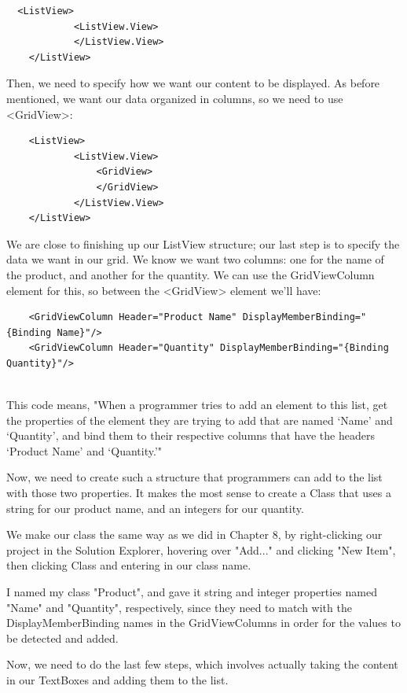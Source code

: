 \documentclass[oneside, openany] {book}
\begin{document}
\begin{verbatim}
  <ListView>
            <ListView.View>
            </ListView.View>
    </ListView>
\end{verbatim}

Then, we need to specify how we want our content to be displayed. As before mentioned, we want our data organized in columns, so we need to use <GridView>:

\begin{verbatim}
    <ListView>
            <ListView.View>
                <GridView>
                </GridView>
            </ListView.View>
    </ListView>
\end{verbatim}
We are close to finishing up our ListView structure; our last step is to specify the data we want in our grid. We know we want two columns: one for the name of the product, and another for the quantity. We can use the GridViewColumn element for this, so between the <GridView> element we'll have:

\begin{verbatim}
    <GridViewColumn Header="Product Name" DisplayMemberBinding="{Binding Name}"/>
    <GridViewColumn Header="Quantity" DisplayMemberBinding="{Binding Quantity}"/>
             
\end{verbatim}
This code means, "When a programmer tries to add an element to this list, get the properties of the element they are trying to add that are named `Name' and `Quantity', and bind them to their respective columns that have the headers `Product Name' and `Quantity.'"

Now, we need to create such a structure that programmers can add to the list with those two properties. It makes the most sense to create a Class that uses a string for our product name, and an integers for our quantity. 

We make our class the same way as we did in Chapter 8, by right-clicking our project in the Solution Explorer, hovering over "Add..." and clicking "New Item", then clicking Class and entering in our class name.

I named my class "Product", and gave it string and integer properties named "Name" and "Quantity", respectively, since they need to match with the DisplayMemberBinding names in the GridViewColumns in order for the values to be detected and added.

Now, we need to do the last few steps, which involves actually taking the content in our TextBoxes and adding them to the list.
\end{document}
